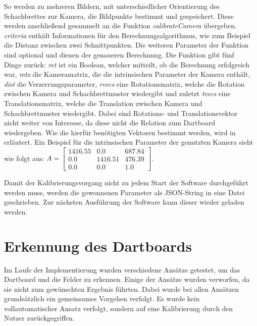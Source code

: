So werden zu mehreren Bildern, mit unterschiedlicher Orientierung des Schachbrettes zur Kamera, die Bildpunkte bestimmt und gespeichert. Diese werden anschließend gesammelt an die Funktion \textit{calibrateCamera} übergeben. \textit{criteria} enthält Informationen für den Berechnungsalgorithmus, wie zum Beispiel die Distanz zwischen zwei Schnittpunkten. Die weiteren Parameter der Funktion sind optional und dienen der genaueren Berechnung.
Die Funktion gibt fünf Dinge zurück: \textit{ret} ist ein Boolean, welcher mitteilt, ob die Berechnung erfolgreich war, \textit{mtx} die Kameramatrix, die die intrinsischen Parameter der Kamera enthält, \textit{dist} die Verzerrungsparameter, \textit{rvecs} eine Rotationsmatrix, welche die Rotation zwischen Kamera und Schachbrettmuster wiedergibt und zuletzt \textit{tvecs} eine Translationsmatrix, welche die Translation zwischen Kamera und Schachbrettmuster wiedergibt. Dabei sind Rotations- und Translationsvektor nicht weiter von Interesse, da diese nicht die Relation zum Dartboard wiedergeben. Wie die hierfür benötigten Vektoren bestimmt werden, wird in  erläutert. Ein Beispiel für die intrinsischen Parameter der genutzten Kamera sieht wie folgt aus:
$A= 
\begin{bmatrix} 
1416.55 & 0.0 & 687.84 \\
0.0 & 1416.51 & 476.39 \\
0.0 & 0.0 & 1.0\end{bmatrix}$.

Damit der Kalibrierungsvorgang nicht zu jedem Start der Software durchgeführt werden muss, werden die gewonnenen Parameter als JSON-String in eine Datei geschrieben. Zur nächsten Ausführung der Software kann dieser wieder geladen werden. 


\section{Erkennung des Dartboards}
\label{sec:board}
%        
Im Laufe der Implementierung wurden verschiedene Ansätze getestet, um das Dartboard und die Felder zu erkennen. Einige der Ansätze wurden verworfen, da sie nicht  zum gewünschten Ergebnis führten. Dabei wurde bei allen Ansätzen grundsätzlich ein gemeinsames Vorgehen verfolgt. Es wurde kein vollautomatischer Ansatz verfolgt, sondern auf eine Kalibrierung durch den Nutzer zurückgegriffen. 

